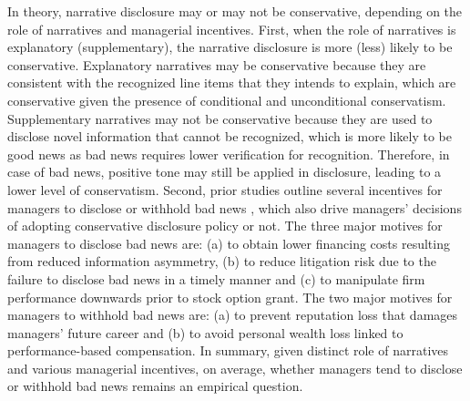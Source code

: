 \documentclass[a4paper]{article}
\begin{document}
\begin{spacing}{2}
In theory, narrative disclosure may or may not be conservative, depending on the role of narratives and managerial incentives. First, when the role of narratives is explanatory (supplementary), the narrative disclosure is more (less) likely to be conservative. Explanatory narratives may be conservative because they are consistent with the recognized line items that they intends to explain, which are conservative given the presence of conditional and unconditional conservatism. Supplementary narratives may not be conservative because they are used to disclose novel information that cannot be recognized, which is more likely to be good news as bad news requires lower verification for recognition. Therefore, in case of bad news, positive tone may still be applied in disclosure, leading to a lower level of conservatism. Second, prior studies outline several incentives for managers to disclose or withhold bad news \cite{skinnerWhyFirmsVoluntarily1994, skinnerEarningsDisclosuresStockholder1997, kothariManagersWithholdBad2009, baoManagersDiscloseWithhold2019}, which also drive managers' decisions of adopting conservative disclosure policy or not. The three major motives for managers to disclose bad news are: (a) to obtain lower financing costs resulting from reduced information asymmetry, (b) to reduce litigation risk due to the failure to disclose bad news in a timely manner and (c) to manipulate firm performance downwards prior to stock option grant. The two major motives for managers to withhold bad news are: (a) to prevent reputation loss that damages managers' future career and (b) to avoid personal wealth loss linked to performance-based compensation. In summary, given distinct role of narratives and various managerial incentives, on average, whether managers tend to disclose or withhold bad news remains an empirical question.


\end{spacing}
\end{document}

